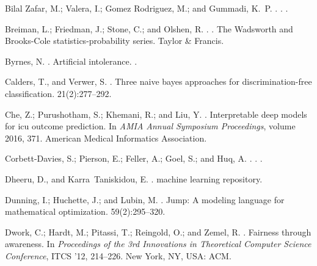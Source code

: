 \documentclass[letterpaper]{article} %
\theoremstyle{definition}
\newcommand{\1}{\ensuremath{{\rm e}}} %
\begin{document}
\begin{thebibliography}{}
	{Bilal Zafar}, M.; {Valera}, I.; {Gomez Rodriguez}, M.; and {Gummadi}, K.~P.
	.
	.
	.
	
	Breiman, L.; Friedman, J.; Stone, C.; and Olshen, R.
	.
	.
	\newblock The Wadsworth and Brooks-Cole statistics-probability series. Taylor
	\& Francis.
	
	Byrnes, N.
	.
	\newblock Artificial intolerance.
	.
	
	Calders, T., and Verwer, S.
	.
	\newblock Three naive bayes approaches for discrimination-free classification.
	 21(2):277--292.
	
	Che, Z.; Purushotham, S.; Khemani, R.; and Liu, Y.
	.
	\newblock Interpretable deep models for icu outcome prediction.
	\newblock In {\em AMIA Annual Symposium Proceedings}, volume 2016,  371.
	\newblock American Medical Informatics Association.
	
	{Corbett-Davies}, S.; {Pierson}, E.; {Feller}, A.; {Goel}, S.; and {Huq}, A.
	.
	.
	.
	
	Dheeru, D., and Karra~Taniskidou, E.
	.
	 machine learning repository.
	
	Dunning, I.; Huchette, J.; and Lubin, M.
	.
	\newblock Jump: A modeling language for mathematical optimization.
	 59(2):295--320.
	
	Dwork, C.; Hardt, M.; Pitassi, T.; Reingold, O.; and Zemel, R.
	.
	\newblock Fairness through awareness.
	\newblock In {\em Proceedings of the 3rd Innovations in Theoretical Computer
		Science Conference}, ITCS '12,  214--226.
	\newblock New York, NY, USA: ACM.
	

\end{thebibliography}
\end{document}
